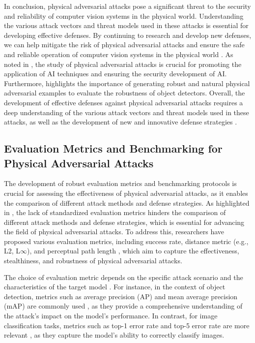 \documentclass[11pt,a4paper]{article}
\begin{document}
In conclusion, physical adversarial attacks pose a significant threat to the security and reliability of computer vision systems in the physical world. Understanding the various attack vectors and threat models used in these attacks is essential for developing effective defenses. By continuing to research and develop new defenses, we can help mitigate the risk of physical adversarial attacks and ensure the safe and reliable operation of computer vision systems in the physical world \cite{arxiv:2209.14262}. As noted in \cite{doi:10.24963/ijcai.2021/694}, the study of physical adversarial attacks is crucial for promoting the application of AI techniques and ensuring the security development of AI. Furthermore, \cite{doi:10.1016/j.jisa.2020.102694} highlights the importance of generating robust and natural physical adversarial examples to evaluate the robustness of object detectors. Overall, the development of effective defenses against physical adversarial attacks requires a deep understanding of the various attack vectors and threat models used in these attacks, as well as the development of new and innovative defense strategies \cite{doi:10.1109/asp-dac47756.2020.9045584}.


\subsection{Evaluation Metrics and Benchmarking for Physical Adversarial Attacks}


The development of robust evaluation metrics and benchmarking protocols is crucial for assessing the effectiveness of physical adversarial attacks, as it enables the comparison of different attack methods and defense strategies. As highlighted in \cite{arxiv:1712.07107}, the lack of standardized evaluation metrics hinders the comparison of different attack methods and defense strategies, which is essential for advancing the field of physical adversarial attacks. To address this, researchers have proposed various evaluation metrics, including success rate, distance metric (e.g., L2, L$\infty$), and perceptual path length \cite{arxiv:1712.09665}, which aim to capture the effectiveness, stealthiness, and robustness of physical adversarial attacks.

The choice of evaluation metric depends on the specific attack scenario and the characteristics of the target model \cite{doi:10.1109/access.2018.2807385}. For instance, in the context of object detection, metrics such as average precision (AP) and mean average precision (mAP) are commonly used \cite{doi:10.1109/lcomm.2019.2901469}, as they provide a comprehensive understanding of the attack's impact on the model's performance. In contrast, for image classification tasks, metrics such as top-1 error rate and top-5 error rate are more relevant \cite{arxiv:1911.05268}, as they capture the model's ability to correctly classify images.
\end{document}

